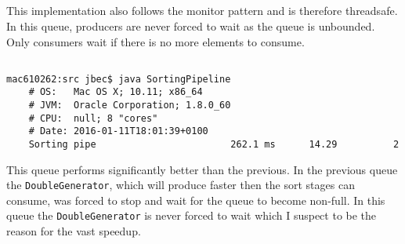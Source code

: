 \documentclass{ituhandin}
\begin{document}
\section{}
This implementation also follows the monitor pattern and is therefore threadsafe. In this queue, producers are never forced to wait as the queue is unbounded. Only consumers wait if there is no more elements to consume.
\section{}
\begin{lstlisting}[language={},frame={}]
    mac610262:src jbec$ java SortingPipeline
    # OS:   Mac OS X; 10.11; x86_64
    # JVM:  Oracle Corporation; 1.8.0_60
    # CPU:  null; 8 "cores"
    # Date: 2016-01-11T18:01:39+0100
    Sorting pipe                        262.1 ms      14.29          2
\end{lstlisting}

This queue performs significantly better than the previous. In the previous queue the \texttt{DoubleGenerator}, which will produce faster then the sort stages can consume, was forced to stop and wait for the queue to become non-full. In this queue the \texttt{DoubleGenerator} is never forced to wait which I suspect to be the reason for the vast speedup.

\chapter{} %
\section{} %
\begin{lstlisting}[caption= Implementation of the \texttt{UnboundedDoubleQueue} blocking queue]
\end{lstlisting}
\section{} %
\section{} %
\section{} %
\section{} %
\end{document}

